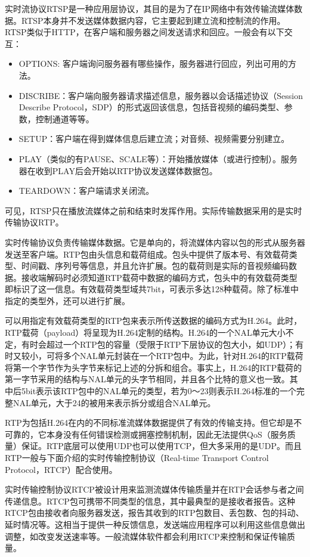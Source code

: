 实时流协议RTSP是一种应用层协议，其目的是为了在IP网络中有效传输流媒体数据。RTSP本身并不发送媒体数据内容，它主要起到建立流和控制流的作用。RTSP类似于HTTP，在客户端和服务器之间发送请求和回应。一般会有以下交互：
\begin{itemize}
\item OPTIONS: 客户端询问服务器有哪些操作，服务器进行回应，列出可用的方法。
\item DISCRIBE：客户端向服务器请求描述信息，服务器以会话描述协议（Session Describe Protocol，SDP）的形式返回该信息，包括音视频的编码类型、参数，控制通道等等。
\item SETUP：客户端在得到媒体信息后建立流；对音频、视频需要分别建立。
\item PLAY（类似的有PAUSE、SCALE等）：开始播放媒体（或进行控制）。服务器在收到PLAY后会开始以RTP协议发送媒体数据包。
\item TEARDOWN：客户端请求关闭流。
\end{itemize}

可见，RTSP只在播放流媒体之前和结束时发挥作用。实际传输数据采用的是实时传输协议RTP。

实时传输协议负责传输媒体数据。它是单向的，将流媒体内容以包的形式从服务器发送至客户端。RTP包由头信息和载荷组成\supercite{RTP}。包头中提供了版本号、有效载荷类型、时间戳、序列号等信息，并且允许扩展。包的载荷则是实际的音视频编码数据。接收端解码时必须知道RTP载荷中数据的编码方式，包头中的有效载荷类型即标识了这一信息。有效载荷类型域共7bit，可表示多达128种载荷。除了标准中指定的类型外，还可以进行扩展。

可以用指定有效载荷类型的RTP包来表示所传送数据的编码方式为H.264。此时，RTP载荷（payload）将呈现为H.264定制的结构\supercite{RTP-H.264}。H.264的一个NAL单元大小不定，有时会超过一个RTP包的容量（受限于RTP下层协议的包大小，如UDP）；有时又较小，可将多个NAL单元封装在一个RTP包中。为此，针对H.264的RTP载荷将第一个字节作为头字节来标记上述的分拆和组合。事实上，H.264的RTP载荷的第一字节采用的结构与NAL单元的头字节相同，并且各个比特的意义也一致。其中后5bit表示该RTP包中的NAL单元的类型，若为0～23则表示H.264标准的一个完整NAL单元，大于24的被用来表示拆分或组合NAL单元。

RTP为包括H.264在内的不同标准流媒体数据提供了有效的传输支持。但它却是不可靠的，它本身没有任何错误检测或拥塞控制机制，因此无法提供QoS（服务质量）保证。RTP底层可以使用UDP也可以使用TCP，但大多采用的是UDP。而且RTP一般与下面介绍的实时传输控制协议（Real-time Transport Control Protocol，RTCP）配合使用。

实时传输控制协议RTCP被设计用来监测流媒体传输质量并在RTP会话参与者之间传递信息。RTCP包可携带不同类型的信息，其中最典型的是接收者报告。这种RTCP包由接收者向服务器发送，报告其收到的RTP包数目、丢包数、包的抖动、延时情况等。这相当于提供一种反馈信息，发送端应用程序可以利用这些信息做出调整，如改变发送速率等。一般流媒体软件都会利用RTCP来控制和保证传输质量。

